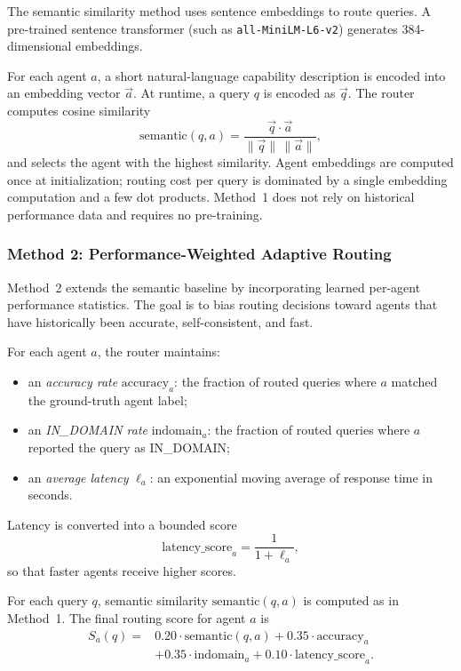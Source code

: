 \documentclass[11pt]{article}
\begin{document}
The semantic similarity method uses sentence embeddings to route queries. A pre-trained sentence transformer (such as \texttt{all-MiniLM-L6-v2}) generates 384-dimensional embeddings.

For each agent $a$, a short natural-language capability description is encoded into an embedding vector $\vec{a}$. At runtime, a query $q$ is encoded as $\vec{q}$. The router computes cosine similarity
\begin{equation}
    \text{semantic}(q,a) =
    \frac{\vec{q} \cdot \vec{a}}{\lVert \vec{q} \rVert \,\lVert \vec{a} \rVert},
\end{equation}
and selects the agent with the highest similarity. Agent embeddings are computed once at initialization; routing cost per query is dominated by a single embedding computation and a few dot products. Method~1 does not rely on historical performance data and requires no pre-training.

\subsubsection{Method 2: Performance-Weighted Adaptive Routing}

Method~2 extends the semantic baseline by incorporating learned per-agent performance statistics. The goal is to bias routing decisions toward agents that have historically been accurate, self-consistent, and fast.

\singlespacing
For each agent $a$, the router maintains:

\begin{itemize}
    \item an \emph{accuracy rate} $\text{accuracy}_a$: the fraction of routed queries where $a$ matched the ground-truth agent label;
    \item an \emph{IN\_DOMAIN rate} $\text{indomain}_a$: the fraction of routed queries where $a$ reported the query as IN\_DOMAIN;
    \item an \emph{average latency} $\ell_a$: an exponential moving average of response time in seconds.
\end{itemize}

Latency is converted into a bounded score
\begin{equation}
    \text{latency\_score}_a = \frac{1}{1 + \ell_a},
\end{equation}
so that faster agents receive higher scores.

For each query $q$, semantic similarity $\text{semantic}(q,a)$ is computed as in Method~1. The final routing score for agent $a$ is
\begin{equation}
    \begin{split}
    S_a(q) ={} & 0.20 \cdot \text{semantic}(q,a)
       + 0.35 \cdot \text{accuracy}_a \\
       & + 0.35 \cdot \text{indomain}_a
       + 0.10 \cdot \text{latency\_score}_a.
    \end{split}
\end{equation}
\end{document}
